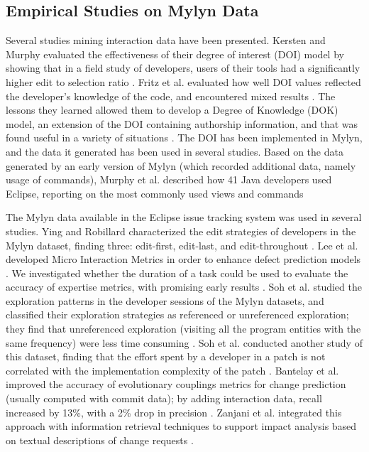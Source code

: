 \documentclass[times]{smrauth}
\begin{document}
\subsection{Empirical Studies on Mylyn Data}

Several studies mining interaction data have been presented. Kersten and Murphy evaluated the effectiveness of their degree of interest (DOI) model by showing that in a field study of developers, users of their tools had a significantly higher edit to selection ratio \cite{KM06}. Fritz et al. evaluated how well DOI values reflected the developer's knowledge of the code, and encountered mixed results \cite{FMH07}. The lessons they learned allowed them to develop a Degree of Knowledge (DOK) model, an extension of the DOI containing authorship information, and that was found useful in a variety of situations \cite{FOMM10}. The DOI has been implemented in Mylyn, and the data it generated has been used in several studies. Based on the data generated by an early version of Mylyn (which recorded additional data, namely usage of commands), Murphy et al. described how 41 Java developers used Eclipse, reporting on the most commonly used views and commands \cite{MKF06}

The Mylyn data available in the Eclipse issue tracking system was used in several studies. Ying and Robillard characterized the edit strategies of developers in the Mylyn dataset, finding three: edit-first, edit-last, and edit-throughout \cite{YR11}. Lee et al. developed Micro Interaction Metrics in order to enhance defect prediction models \cite{LJD11}. We investigated whether the duration of a task could be used to evaluate the accuracy of expertise metrics, with promising early results \cite{RD13}. Soh et al. studied the exploration patterns in the developer sessions of the Mylyn datasets, and classified their exploration strategies as referenced or unreferenced exploration; they find that unreferenced exploration (visiting all the program entities with the same frequency) were less time consuming \cite{SKGAA13}. Soh et al. conducted another study of this dataset, finding that the effort spent by a developer in a patch is not correlated with the implementation complexity of the patch \cite{SKGA13}. Bantelay et al. improved the accuracy of evolutionary couplings metrics for change prediction (usually computed with commit data); by adding interaction data, recall increased by 13\%, with a 2\% drop in precision \cite{BZK13}. Zanjani et al. integrated this approach with information retrieval techniques to support impact analysis based on textual descriptions of change requests \cite{ZSK14}.
\end{document}
